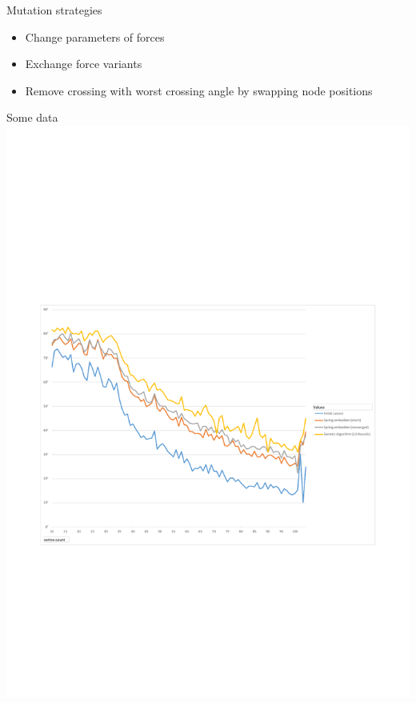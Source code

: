 \documentclass[notheorems]{beamer}
\theoremstyle{plain}
\theoremstyle{definition}
\theoremstyle{remark}
\begin{document}
\begin{frame}{Mutation strategies}
\begin{itemize}
\item Change parameters of forces 
\item Exchange force variants
\item Remove crossing with worst crossing angle by swapping node positions
\end{itemize}
\end{frame}
\begin{frame}{Some data}
\includegraphics[width=\textwidth, trim={0 0 0 8.7cm}, clip]{data_force_vs_genetic.pdf}
\end{frame}
\end{document}
